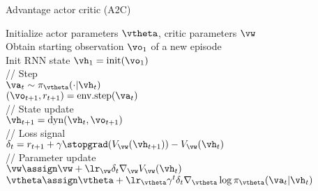 
\begin{algorithm}
\dontprintsemicolon
\caption{Advantage actor critic (A2C)}
Initialize actor parameters $\vtheta$,
critic parameters $\vw$ \\
       {
         Obtain starting observation $\vo_1$ of a new episode \\
         Init RNN state $\vh_1=\text{init}(\vo_1)$ \\
           {
            // Step \\
       $\va_t \sim \pi_{\vtheta}(\cdot|\vh_t)$ \\
       $(\vo_{t+1}, r_{t+1}) = \text{env.step}(\va_t)$ \\

       // State update \\
       $\vh_{t+1} = \text{dyn}(\vh_{t}, \vo_{t+1})$ \\

       // Loss signal \\
       $\delta_t = r_{t+1} + \gamma \stopgrad(V_{\vw}(\vh_{t+1})) - V_{\vw}(\vh_t)$ \\
       
       // Parameter update \\
            $\vw  \assign \vw + \lr_{\vw} \delta_t \nabla_{\vw} V_{\vw}(\vh_t)$ \\
        $\vtheta \assign \vtheta +
        \lr_{\vtheta} \gamma^t \delta_t \nabla_{\vtheta} \log \pi_{\vtheta}(\va_t|\vh_t)$ \\

           }
}
\end{algorithm}



